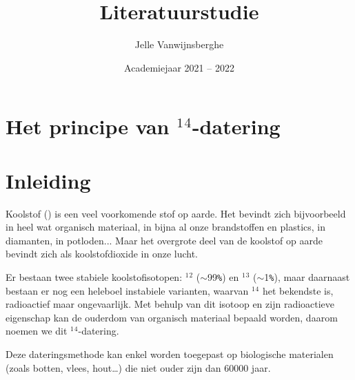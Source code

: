 \documentclass[kulak]{kulakarticle} %
\title{Literatuurstudie}
\author{Jelle Vanwijnsberghe}
\date{Academiejaar 2021 -- 2022}
\begin{document}
\maketitle

\section*{Het principe van $^1$$^4$-datering}

\section*{Inleiding}

Koolstof () is een veel voorkomende stof op aarde. Het bevindt zich bijvoorbeeld in heel wat organisch materiaal, in bijna al onze brandstoffen en plastics, in diamanten, in potloden... Maar het overgrote deel van de koolstof op aarde bevindt zich als koolstofdioxide in onze lucht. 

Er bestaan twee stabiele koolstofisotopen: $^1$$^2$ ($\sim$\num{99}\verb|%|) en $^1$$^3$ ($\sim$\num{1}\verb|%|), maar daarnaast bestaan er nog een heleboel instabiele varianten, waarvan $^1$$^4$ het bekendste is, radioactief maar ongevaarlijk. Met behulp van dit isotoop en zijn radioactieve eigenschap kan de ouderdom van organisch materiaal bepaald worden, daarom noemen we dit $^1$$^4$-datering.

Deze dateringsmethode kan enkel worden toegepast op biologische materialen (zoals botten, vlees, hout…) die niet ouder zijn dan \num{60000} jaar. 
\end{document}
